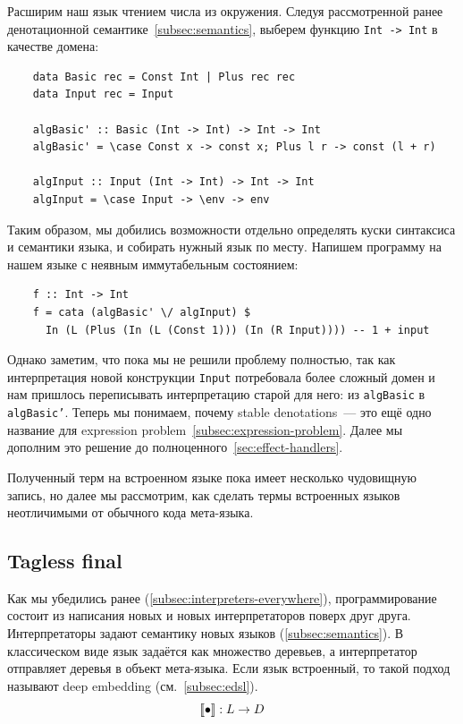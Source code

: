 Расширим наш язык чтением числа из окружения.
Следуя рассмотренной ранее денотационной семантике~\ref{subsec:semantics}, выберем функцию \texttt{Int -> Int} в качестве домена:
\begin{verbatim}
    data Basic rec = Const Int | Plus rec rec
    data Input rec = Input

    algBasic' :: Basic (Int -> Int) -> Int -> Int
    algBasic' = \case Const x -> const x; Plus l r -> const (l + r)

    algInput :: Input (Int -> Int) -> Int -> Int
    algInput = \case Input -> \env -> env
\end{verbatim}

Таким образом, мы добились возможности отдельно определять куски синтаксиса и семантики языка, и собирать нужный язык по месту.
Напишем программу на нашем языке с неявным иммутабельным состоянием:
\begin{verbatim}
    f :: Int -> Int
    f = cata (algBasic' \/ algInput) $
      In (L (Plus (In (L (Const 1))) (In (R Input)))) -- 1 + input
\end{verbatim}

Однако заметим, что пока мы не решили проблему полностью, так как интерпретация новой конструкции \texttt{Input} потребовала более сложный домен и нам пришлось переписывать интерпретацию старой для него: из \texttt{algBasic} в \texttt{algBasic'}.
Теперь мы понимаем, почему stable denotations~--- это ещё одно название для expression problem~\ref{subsec:expression-problem}.
Далее мы дополним это решение до полноценного~\ref{sec:effect-handlers}.

Полученный терм на встроенном языке пока имеет несколько чудовищную запись, но далее мы рассмотрим, как сделать термы встроенных языков неотличимыми от обычного кода мета-языка.

\subsection{Tagless final} \label{sec:wonder-interpreters}


Как мы убедились ранее (\ref{subsec:interpreters-everywhere}), программирование состоит из написания новых и новых интерпретаторов поверх друг друга.
Интерпретаторы задают семантику новых языков (\ref{subsec:semantics}).
В классическом виде язык задаётся как множество деревьев, а интерпретатор отправляет деревья в объект мета-языка.
Если язык встроенный, то такой подход называют deep embedding (см.~\ref{subsec:edsl}).
\[
    \llbracket{\bullet}\rrbracket : L \to D
\]

